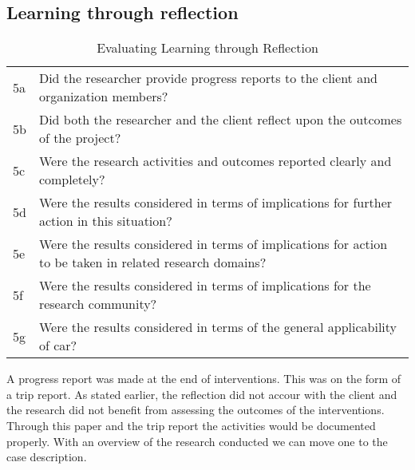 \subsection{Learning through reflection}
\begin{table}[h]
\centering
\begin{tabular}{p{2cm} p{8cm}}
\hline
5a & Did the researcher provide progress reports to the client and organization members? \\
5b & Did both the researcher and the client reflect upon the outcomes of the project? \\
5c & Were the research activities and outcomes reported clearly and completely? \\
5d & Were the results considered in terms of implications for further action in this situation?  \\
5e & Were the results considered in terms of implications for action to be taken in related research domains? \\
5f & Were the results considered in terms of implications for the research community? \\
5g & Were the results considered in terms of the general applicability of \gls{car}?  \\
\hline
\end{tabular}
\caption{Evaluating Learning through Reflection}
\label{tab:eva}
\end{table}
A progress report was made at the end of interventions. This was on the form of a trip report.
As stated earlier, the reflection did not accour with the client and the research did not benefit from assessing the outcomes of the interventions. Through this paper and the trip report the activities would be documented properly.
With an overview of the research conducted we can move one to the case description. 
\cite{car:rmn}
